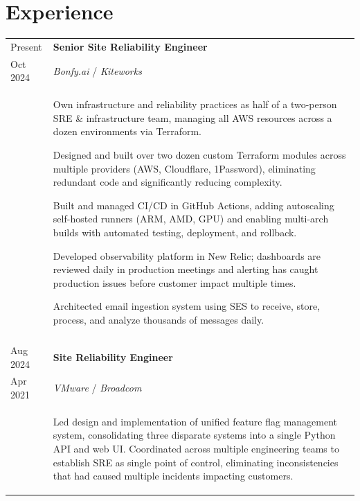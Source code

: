 \documentclass[10pt]{article}
\newcommand{\afterlistspace}[0]{\vspace{-1.5em}}
\begin{document}



\section{Experience}

\begin{tabular}{p{1.5cm}|p{16cm}}

    Present & \textbf{Senior Site Reliability Engineer}
    \\
    Oct 2024 & \emph{Bonfy.ai} / \emph{Kiteworks}
    \\
    & \begin{itemize}
        \setlength{\itemsep}{0.25em}
        \footnotesize{
            \item Own infrastructure and reliability practices as half of a two-person SRE \& infrastructure team, managing all AWS resources across a dozen environments via Terraform.

            \item Designed and built over two dozen custom Terraform modules across multiple providers (AWS, Cloudflare, 1Password), eliminating redundant code and significantly reducing complexity.

            \item Built and managed CI/CD in GitHub Actions, adding autoscaling self-hosted runners (ARM, AMD, GPU) and enabling multi-arch builds with automated testing, deployment, and rollback.

            \item Developed observability platform in New Relic; dashboards are reviewed daily in production meetings and alerting has caught production issues before customer impact multiple times.
            
            \item Architected email ingestion system using SES to receive, store, process, and analyze thousands of messages daily.
            }

        \afterlistspace
    \end{itemize}
    
    \\
    \multicolumn{2}{c}{}
    \\

    Aug 2024 & \textbf{Site Reliability Engineer}
    \\
    Apr 2021 & \emph{VMware} / \emph{Broadcom}
    \\
    & \begin{itemize}
        \setlength{\itemsep}{0.25em}
        \footnotesize{
            \item Led design and implementation of unified feature flag management system, consolidating three disparate systems into a single Python API and web UI. Coordinated across multiple engineering teams to establish SRE as single point of control, eliminating inconsistencies that had caused multiple incidents impacting customers.

}
\end{itemize}
\end{tabular}
\end{document}
